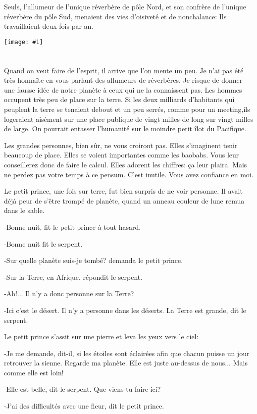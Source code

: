 \documentclass{report}
\newcommand{\parachapter}[2][]{\chapter[#1]{#2}}
\newcommand{\incpic}[1]{%
\begin{center}
    \texttt{[image: \#1]}
\end{center}%
}
\begin{document}
Seuls, l'allumeur de l'unique réverbère de pôle Nord, et son confrère de l'unique réverbère du pôle Sud, menaient des vies d'oisiveté et de nonchalance: Ils travaillaient deux fois par an.

\incpic{pic/image32.png}

\parachapter{} %
Quand on veut faire de l'esprit, il arrive que l'on mente un peu. Je n'ai pas été très honnaîte en vous parlant des allumeurs de réverbères. Je risque de donner une fausse idée de notre planète à ceux qui ne la connaissent pas. Les hommes occupent très peu de place sur la terre. Si les deux milliards d'habitants qui peuplent la terre se tenaient debout et un peu serrés, comme pour un meeting,ils logeraient aisément sur une place publique de vingt milles de long sur vingt milles de large. On pourrait entasser l'humanité sur le moindre petit îlot du Pacifique.

Les grandes personnes, bien sûr, ne vous croiront pas. Elles s'imaginent tenir beaucoup de place. Elles se voient importantes comme les baobabs. Vous leur conseillerez donc de faire le calcul. Elles adorent les chiffres: ça leur plaira. Mais ne perdez pas votre temps à ce pensum. C'est inutile. Vous avez confiance en moi.

Le petit prince, une fois sur terre, fut bien surpris de ne voir personne. Il avait déjà peur de s'être trompé de planète, quand un anneau couleur de lune remua dans le sable.

-Bonne nuit, fit le petit prince à tout hasard.

-Bonne nuit fit le serpent.

-Sur quelle planète suis-je tombé? demanda le petit prince.

-Sur la Terre, en Afrique, répondit le serpent.

-Ah!... Il n'y a donc personne sur la Terre?

-Ici c'est le désert. Il n'y a personne dans les déserts. La Terre est grande, dit le serpent.

Le petit prince s'assit sur une pierre et leva les yeux vers le ciel:

-Je me demande, dit-il, si les étoiles sont éclairées afin que chacun puisse un jour retrouver la sienne. Regarde ma planète. Elle est juste au-dessus de nous... Mais comme elle est loin!

-Elle est belle, dit le serpent. Que viens-tu faire ici?

-J'ai des difficultés avec une fleur, dit le petit prince.
\end{document}
